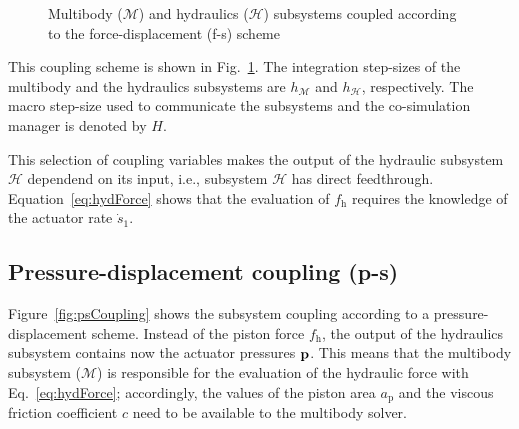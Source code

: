 \documentclass[fleqn,11pt]{article}
\newcommand{\pres}		{ {\bf{p}} }
\newcommand{\hM}    	{ h_{\mathcal{M}} }
\newcommand{\hH}     	{ h_{\mathcal{H}} }
\begin{document}
\begin{figure}[!ht]
	\caption{Multibody ($\mathcal{M}$) and hydraulics ($\mathcal{H}$) subsystems coupled according to the force-displacement (f-s) scheme} 
	\label{fig:fsCoupling}
\end{figure}

This coupling scheme is shown in Fig.~\ref{fig:fsCoupling}.
The integration step-sizes of the multibody and the hydraulics subsystems are $\hM$ and $\hH$, respectively.
The macro step-size used to communicate the subsystems and the co-simulation manager is denoted by $H$.

This selection of coupling variables makes the output of the hydraulic subsystem $\mathcal{H}$ dependend on its input, i.e., subsystem $\mathcal{H}$ has direct feedthrough.
Equation~\eqref{eq:hydForce} shows that the evaluation of $f_{\text{h}}$ requires the knowledge of the actuator rate $\dot{s}_1$.

\subsection{Pressure-displacement coupling (p-s)}
\label{PSCoupling}

Figure~\ref{fig:psCoupling} shows the subsystem coupling according to a pressure-displacement scheme.
Instead of the piston force $f_{\text{h}}$, the output of the hydraulics subsystem contains now the actuator pressures $\pres$.
This means that the multibody subsystem ($\mathcal{M}$) is responsible for the evaluation of the hydraulic force with Eq.~\eqref{eq:hydForce}; accordingly, the values of the piston area $a_{\text{p}}$ and the viscous friction coefficient $c$ need to be available to the multibody solver.
\end{document}
